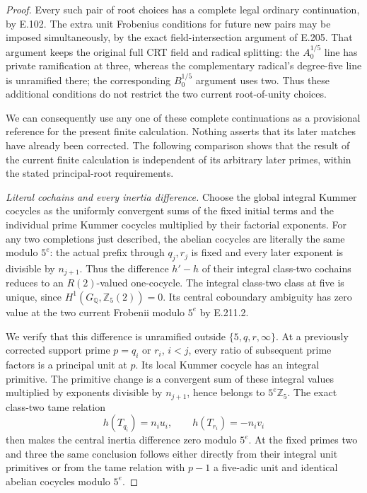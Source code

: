 \begin{proof}
Every such pair of root choices has a complete legal ordinary
continuation, by E.102. The extra unit Frobenius conditions
for future new pairs may be imposed simultaneously, by the
exact field-intersection argument of E.205. That argument keeps
the original full CRT field and radical splitting: the
$A_0^{1/5}$ line has private ramification at three, whereas
the complementary radical's degree-five line is unramified
there; the corresponding $B_0^{1/5}$ argument uses two.
Thus these additional conditions do not restrict the two
current root-of-unity choices.

We can consequently use any one of these complete continuations
as a provisional reference for the present finite calculation.
Nothing asserts that its later matches have already been
corrected. The following comparison shows that the result of
the current finite calculation is independent of its arbitrary
later primes, within the stated principal-root requirements.

\emph{Literal cochains and every inertia difference.}
Choose the global integral Kummer cocycles as the uniformly
convergent sums of the fixed initial terms and the individual
prime Kummer cocycles multiplied by their factorial exponents.
For any two completions just described, the abelian cocycles
are literally the same modulo $5^e$: the actual prefix through
$q_j,r_j$ is fixed and every later exponent is divisible by
$n_{j+1}$. Thus the difference $h'-h$ of their integral
class-two cochains reduces to an $R(2)$-valued one-cocycle.
The integral class-two class at five is unique, since
$H^1(G_{\mathbb Q},\mathbb Z_5(2))=0$. Its central coboundary
ambiguity has zero value at the two current Frobenii modulo
$5^e$ by E.211.2.

We verify that this difference is unramified outside
$\{5,q,r,\infty\}$. At a previously corrected support prime
$p=q_i$ or $r_i$, $i<j$, every ratio of subsequent prime
factors is a principal unit at $p$. Its local Kummer cocycle
has an integral primitive. The primitive change is a convergent
sum of these integral values multiplied by exponents divisible
by $n_{j+1}$, hence belongs to $5^e\mathbb Z_5$.
The exact class-two tame relation
\[
             h(T_{q_i})=n_i u_i,
             \qquad h(T_{r_i})=-n_i v_i
 \tag{E.211.6}
\]
then makes the central inertia difference zero modulo $5^e$.
At the fixed primes two and three the same conclusion follows
either directly from their integral unit primitives or from
the tame relation with $p-1$ a five-adic unit and identical
abelian cocycles modulo $5^e$.


\end{proof}
